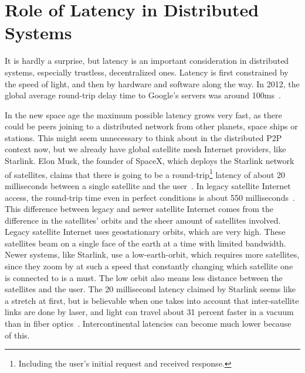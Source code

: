 \section{Role of Latency in Distributed Systems}
It is hardly a surprise, but latency is an important consideration in distributed systems, especially trustless, decentralized ones. Latency is first constrained by the speed of light, and then by hardware and software along the way. In 2012, the global average round-trip delay time to Google's servers was around 100ms~\cite{Grigorik_undated-mc}.

In the new space age the maximum possible latency grows very fast, as there could be peers joining to a distributed network from other planets, space ships or stations. This might seem unnecessary to think about in the distributed P2P context now, but we already have global satellite mesh Internet providers, like Starlink. Elon Musk, the founder of SpaceX, which deploys the Starlink network of satellites, claims that there is going to be a round-trip\footnote{Including the user's initial request and received response.} latency of about 20 milliseconds between a single satellite and the user~\cite{Tung_undated-ny}. In legacy satellite Internet access, the round-trip time even in perfect conditions is about 550 milliseconds~\cite{noauthor_undated-zc}. This difference between legacy and newer satellite Internet comes from the difference in the satellites' orbits and the sheer amount of satellites involved. Legacy satellite Internet uses geostationary orbits, which are very high. These satellites beam on a single face of the earth at a time with limited bandwidth. Newer systems, like Starlink, use a low-earth-orbit, which requires more satellites, since they zoom by at such a speed that constantly changing which satellite one is connected to is a must. The low orbit also means less distance between the satellites and the user. The 20 millisecond latency claimed by Starlink seems like a stretch at first, but is believable when one takes into account that inter-satellite links are done by laser, and light can travel about 31 percent faster in a vacuum than in fiber optics~\cite{Finley2013-wt}. Intercontinental latencies can become much lower because of this.

